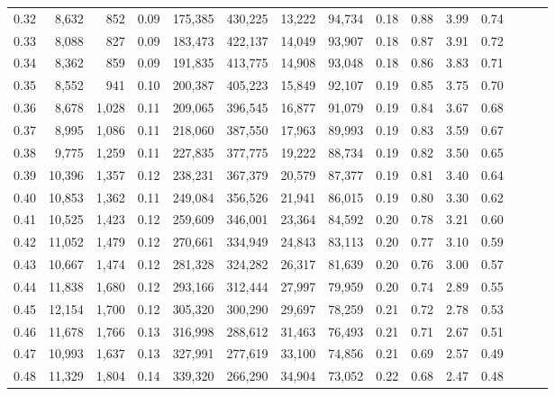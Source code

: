 \begin{tabular}{rrrrrrrrrrrrrrr}
0.32 &   8,632 &    852 &  0.09 &  175,385 &  430,225 &   13,222 &   94,734 &  0.18 &  0.88 &  3.99 &      0.74 \\
0.33 &   8,088 &    827 &  0.09 &  183,473 &  422,137 &   14,049 &   93,907 &  0.18 &  0.87 &  3.91 &      0.72 \\
0.34 &   8,362 &    859 &  0.09 &  191,835 &  413,775 &   14,908 &   93,048 &  0.18 &  0.86 &  3.83 &      0.71 \\
0.35 &   8,552 &    941 &  0.10 &  200,387 &  405,223 &   15,849 &   92,107 &  0.19 &  0.85 &  3.75 &      0.70 \\
0.36 &   8,678 &  1,028 &  0.11 &  209,065 &  396,545 &   16,877 &   91,079 &  0.19 &  0.84 &  3.67 &      0.68 \\
0.37 &   8,995 &  1,086 &  0.11 &  218,060 &  387,550 &   17,963 &   89,993 &  0.19 &  0.83 &  3.59 &      0.67 \\
0.38 &   9,775 &  1,259 &  0.11 &  227,835 &  377,775 &   19,222 &   88,734 &  0.19 &  0.82 &  3.50 &      0.65 \\
0.39 &  10,396 &  1,357 &  0.12 &  238,231 &  367,379 &   20,579 &   87,377 &  0.19 &  0.81 &  3.40 &      0.64 \\
0.40 &  10,853 &  1,362 &  0.11 &  249,084 &  356,526 &   21,941 &   86,015 &  0.19 &  0.80 &  3.30 &      0.62 \\
0.41 &  10,525 &  1,423 &  0.12 &  259,609 &  346,001 &   23,364 &   84,592 &  0.20 &  0.78 &  3.21 &      0.60 \\
0.42 &  11,052 &  1,479 &  0.12 &  270,661 &  334,949 &   24,843 &   83,113 &  0.20 &  0.77 &  3.10 &      0.59 \\
0.43 &  10,667 &  1,474 &  0.12 &  281,328 &  324,282 &   26,317 &   81,639 &  0.20 &  0.76 &  3.00 &      0.57 \\
0.44 &  11,838 &  1,680 &  0.12 &  293,166 &  312,444 &   27,997 &   79,959 &  0.20 &  0.74 &  2.89 &      0.55 \\
0.45 &  12,154 &  1,700 &  0.12 &  305,320 &  300,290 &   29,697 &   78,259 &  0.21 &  0.72 &  2.78 &      0.53 \\
0.46 &  11,678 &  1,766 &  0.13 &  316,998 &  288,612 &   31,463 &   76,493 &  0.21 &  0.71 &  2.67 &      0.51 \\
0.47 &  10,993 &  1,637 &  0.13 &  327,991 &  277,619 &   33,100 &   74,856 &  0.21 &  0.69 &  2.57 &      0.49 \\
0.48 &  11,329 &  1,804 &  0.14 &  339,320 &  266,290 &   34,904 &   73,052 &  0.22 &  0.68 &  2.47 &      0.48 \\

\end{tabular}
